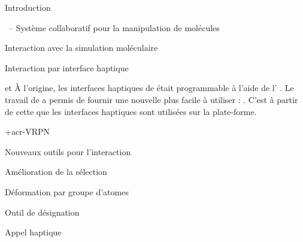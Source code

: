 \documentclass[myfrancais]{mythesis}
\begin{document}
\begin{mypart}{Introduction}
\begin{mychapter}{\myShaddock\ -- Système collaboratif pour la manipulation de molécules}
\begin{mysection}{Interaction avec la simulation moléculaire}
\begin{mysubsection}{Interaction par interface haptique}
\begin{mysubsubsection}{\myOmni et \myOpenHaptics}
						À l'origine, les interfaces haptiques de \mySensAble était programmable à l'aide de l' \myGhost {}.
						Le travail de  a permis de fournir une nouvelle  plus facile à utiliser : \myOpenHaptics.
						C'est à partir de cette  que les interfaces haptiques sont utilisées sur la plate-forme.
					\end{mysubsubsection}
					\begin{mysubsubsection}{\myacronl+{acr-VRPN}}
					\end{mysubsubsection}
				\end{mysubsection}
			\end{mysection}
			\begin{mysection}{Nouveaux outils pour l'interaction}
				\begin{mysubsection}{Amélioration de la sélection}
				\end{mysubsection}
				\begin{mysubsection}{Déformation par groupe d'atomes}
				\end{mysubsection}
				\begin{mysubsection}{Outil de désignation}
				\end{mysubsection}
				\begin{mysubsection}{Appel haptique}
				\end{mysubsection}
			\end{mysection}
		\end{mychapter}
	\end{mypart}
\end{document}
